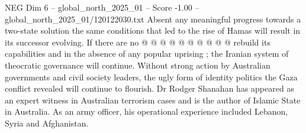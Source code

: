 \begin{textsample}{NEG Dim 6 – global\_north\_2025\_01 – Score -1.00 – global\_north\_2025\_01/120122030.txt}
Absent any meaningful progress towards a two-state solution the same conditions that led to the rise of Hamas will result in its successor evolving.
If there are no @ @ @ @ @ @ @ @ @ @ rebuild its capabilities and in the absence of any popular uprising ; the Iranian system of theocratic governance will continue.
Without strong action by Australian governments and civil society leaders, the ugly form of identity politics the Gaza conflict revealed will continue to flourish.
Dr Rodger Shanahan has appeared as an expert witness in Australian terrorism cases and is the author of Islamic State in Australia.
As an army officer, his operational experience included Lebanon, Syria and Afghanistan.

\end{textsample}
